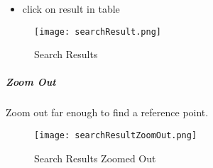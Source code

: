 \begin{itemize}

\item click on result in table

\end{itemize}
\begin{figure}[H]
\centering
    \texttt{[image: searchResult.png]}
\vspace{-.1in}

\caption{Search Results}
\end{figure}

\clearpage

\subparagraph*{Zoom Out}

\noindent Zoom out far enough to find a reference point.
\begin{figure}[H]
\centering
    \texttt{[image: searchResultZoomOut.png]}
\vspace{-.1in}

\caption{Search Results Zoomed Out}
\end{figure}




